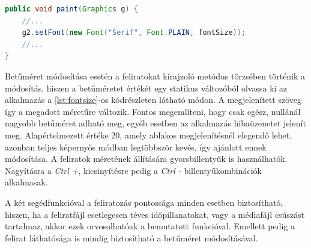 \begin{spacing}{1.25}
\begin{lstlisting}[caption=Feliratok mérete, label={lst:fontsize}, language=java]
public void paint(Graphics g) {
	//...
	g2.setFont(new Font("Serif", Font.PLAIN, fontSize));
	//...
}
\end{lstlisting}
\end{spacing}

Betűméret módosítása esetén a feliratokat kirajzoló metódus törzsében történik a módosítás, hiszen a betűméretet értékét egy statikus változóból olvassa ki az alkalmazás a \ref{lst:fontsize}-os kódrészleten látható módon. A megjelenített szöveg így a megadott méretűre változik. Fontos megemlíteni, hogy csak egész, nullánál nagyobb betűméret adható meg, egyéb esetben az alkalmazás hibaüzenetet jelenít meg. Alapértelmezett értéke 20, amely ablakos megjelenítésnél elegendő lehet, azonban teljes képernyős módban legtöbbször kevés, így ajánlott ennek módosítása. A feliratok méretének állítására gyorsbillentyűk is használhatók. Nagyításra a \textit{Ctrl +}, kicsinyítésre pedig a \textit{Ctrl -} billentyűkombinációk alkalmasak.

A két segédfunkcióval a feliratozás pontossága minden esetben biztosítható, hiszen, ha a feliratfájl esetlegesen téves időpillanatokat, vagy a médiafájl csúszást tartalmaz, akkor ezek orvosolhatóak a bemutatott funkcióval. Emellett pedig a felirat láthatósága is mindig biztosítható a betűméret módosításával.